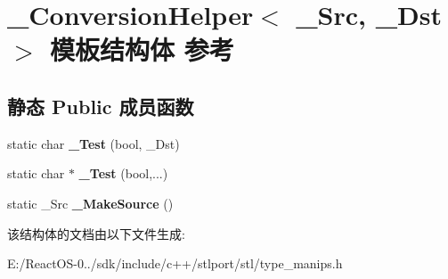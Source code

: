 \hypertarget{struct___conversion_helper}{}\section{\+\_\+\+Conversion\+Helper$<$ \+\_\+\+Src, \+\_\+\+Dst $>$ 模板结构体 参考}
\label{struct___conversion_helper}
\subsection*{静态 Public 成员函数}
\begin{DoxyCompactItemize}
\item 
\mbox{\label{struct___conversion_helper_aae2be1cf55ae21ede608300717aa3fc8}} 
static char {\bfseries \+\_\+\+Test} (bool, \+\_\+\+Dst)
\item 
\mbox{\label{struct___conversion_helper_a2b90eb4b798eb8e7ca21604a5df0e4ac}} 
static char $\ast$ {\bfseries \+\_\+\+Test} (bool,...)
\item 
\mbox{\label{struct___conversion_helper_ad9b2a1e0b292375c73c4670b51198fbe}} 
static \+\_\+\+Src {\bfseries \+\_\+\+Make\+Source} ()
\end{DoxyCompactItemize}


该结构体的文档由以下文件生成\+:\begin{DoxyCompactItemize}
\item 
E\+:/\+React\+O\+S-\/0../sdk/include/c++/stlport/stl/type\+\_\+manips.\+h\end{DoxyCompactItemize}
